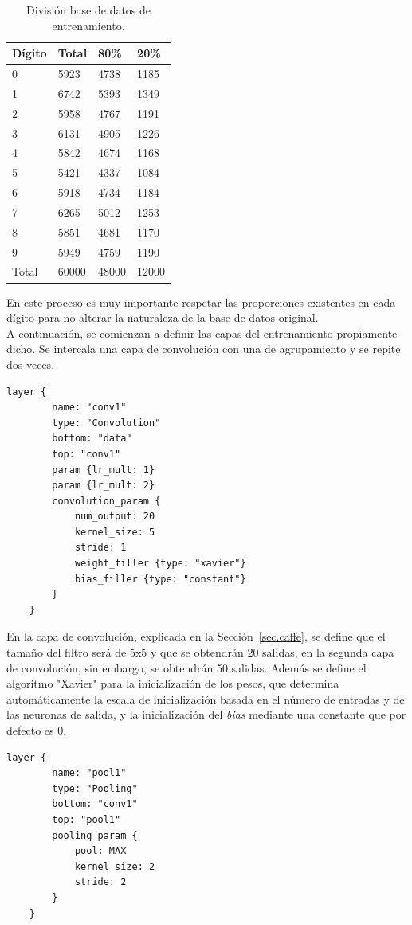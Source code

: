 	\begin{table}[htb]
		\centering
		\begin{tabular}{|l|l|l|l|}
			\hline
			Dígito & Total & 80\% & 20\% \\
			\hline \hline
			0 & 5923 & 4738 & 1185\\ \hline
			1 & 6742 & 5393 & 1349\\ \hline
			2 & 5958 & 4767 & 1191\\ \hline
			3 & 6131 & 4905 & 1226\\ \hline
			4 & 5842 & 4674 & 1168\\ \hline
			5 & 5421 & 4337 & 1084\\ \hline
			6 & 5918 & 4734 & 1184\\ \hline
			7 & 6265 & 5012 & 1253\\ \hline
			8 & 5851 & 4681 & 1170\\ \hline
			9 & 5949 & 4759 & 1190\\ \hline
			Total & 60000 & 48000 & 12000\\ \hline
		\end{tabular}
		\caption{División base de datos de entrenamiento.}
		\label{tabla:sencilla2}
	\end{table}
	\vspace{20pt}
	En este proceso es muy importante respetar las proporciones existentes en cada dígito para no alterar la naturaleza de la base de datos original.\\
	
	A continuación, se comienzan a definir las capas del entrenamiento propiamente dicho. Se intercala una capa de convolución con una de agrupamiento y se repite dos veces.
	\vspace{10pt}
	\begin{lstlisting}[frame=single]
	layer {
		name: "conv1"
		type: "Convolution"
		bottom: "data"
		top: "conv1"
		param {lr_mult: 1}
		param {lr_mult: 2}
		convolution_param {
			num_output: 20
			kernel_size: 5
			stride: 1
			weight_filler {type: "xavier"}
			bias_filler {type: "constant"}
		}
	}	
	\end{lstlisting}

	En la capa de convolución, explicada en la Sección~\ref{sec.caffe}, se define que el tamaño del filtro será de 5x5 y que se obtendrán 20 salidas, en la segunda capa de convolución, sin embargo, se obtendrán 50 salidas. Además se define el algoritmo "Xavier" para la inicialización de los pesos, que determina automáticamente la escala de inicialización basada en el número de entradas y de las neuronas de salida, y la inicialización del \textit{bias} mediante una constante que por defecto es 0.
	\vspace{10pt}
	\begin{lstlisting}[frame=single]
	layer {
		name: "pool1"
		type: "Pooling"
		bottom: "conv1"
		top: "pool1"
		pooling_param {
			pool: MAX
			kernel_size: 2
			stride: 2
		}
	}	
	\end{lstlisting}
	
